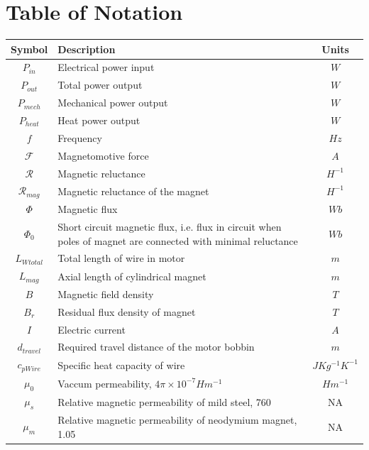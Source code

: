 \documentclass[a4paper,12pt]{article}
\begin{document}
\section{Table of Notation}
\begin{center}
	\begin{tabular}{c | L | c} 
		\textbf{Symbol} & \textbf{Description} & \textbf{Units} \\ [0.5ex] 
		\hline\hline
		$P_{in}$ & Electrical power input & $W$ \\ 
		\hline
		$P_{out}$ & Total power output & $W$ \\ 
		\hline
		$P_{mech}$ & Mechanical power output & $W$ \\ 
		\hline
		$P_{heat}$ & Heat power output & $W$ \\ 
		\hline
		$f$ & Frequency & $Hz$ \\ 
		\hline
		$\mathcal{F}$ & Magnetomotive force & $A$ \\ 
		\hline
		$\mathcal{R}$ & Magnetic reluctance & $H^{-1}$ \\ 
		\hline
		$\mathcal{R}_{mag}$ & Magnetic reluctance of the magnet & $H^{-1}$ \\ 
		\hline
		$\Phi$ & Magnetic flux & $Wb$ \\ 
		\hline
		$\Phi_0$ & Short circuit magnetic flux, i.e. flux in circuit when poles of magnet are connected with minimal reluctance & $Wb$ \\ 
		\hline
		$L_{Wtotal}$ & Total length of wire in motor & $m$ \\
		\hline
		$L_{mag}$ & Axial length of cylindrical magnet & $m$ \\
		\hline
		$B$ & Magnetic field density & $T$ \\
		\hline
		$B_{r}$ & Residual flux density of magnet & $T$ \\
		\hline
		$I$ & Electric current & $A$ \\
		\hline
		$d_{travel}$ & Required travel distance of the motor bobbin & $m$ \\
		\hline
		$c_{pWire}$ & Specific heat capacity of wire & $JKg^{-1}K^{-1}$ \\
		\hline
		$\mu_0$ & Vaccum permeability, $4\pi\times10^{-7} Hm^{-1}$ \cite{engineeringtoolboxPermeability2016} & $Hm^{-1}$ \\
		\hline
		$\mu_s$ & Relative magnetic permeability of mild steel, 760 \cite{baartmanMaterialsLibraryFEMM2007} & NA \\
		\hline
		$\mu_m$ & Relative magnetic permeability of neodymium magnet, 1.05 \cite{engineeringtoolboxPermeability2016} & NA \\
		\hline
	\end{tabular}
\end{center}
\end{document}
